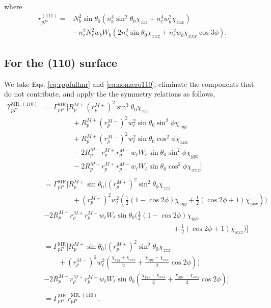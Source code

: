 where
\begin{equation}\label{eq:final-rpp.111}
\begin{split}
r^{(111)}_{pP} = 
&N^{2}_{b}\sin\theta_{0}(n^{4}_{b}\sin^{2}\theta_{0}\chi_{zzz} 
+ n^{4}_{\ell}w^{2}_{b}\chi_{zxx})\\
&- n^{2}_{\ell}N^{2}_{\ell}w_{b}W_{b}(2n^{2}_{b}\sin\theta_{0}\chi_{xxz}
 + n^{2}_{\ell}w_{b}\chi_{xxx}\cos3\phi).
\end{split}
\end{equation}


\subsection{For the (110) surface}

We take Eqs. \eqref{eq:rppfullmr} and \eqref{eq:nonzero110}, eliminate the
components that do not contribute, and apply the the symmetry relations as
follows,
\begin{equation*}
\begin{split}
\Upsilon^{\mathrm{MR},(110)}_{pP} &=
\Gamma^{\mathrm{MR}}_{pP}
\bigg[
R^{M+}_{p}\left(r^{M+}_{p}\right)^{2}\sin^{3}\theta_{0}\chi_{zzz}\\
&\qquad\qquad+ R^{M+}_{p}\left(r^{M-}_{p}\right)^{2}w^{2}_{\ell}
      \sin\theta_{0}\sin^{2}\phi\chi_{zyy}\\
&\qquad\qquad+ R^{M+}_{p}\left(r^{M-}_{p}\right)^{2}w^{2}_{\ell}
      \sin\theta_{0}\cos^{2}\phi\chi_{zxx}\\
&\qquad\qquad- 2R^{M-}_{p}r^{M+}_{p}r^{M-}_{p}w_{\ell}W_{\ell}
      \sin\theta_{0}\sin^{2}\phi\chi_{yyz}\\
&\qquad\qquad- 2R^{M-}_{p}r^{M+}_{p}r^{M-}_{p}w_{\ell}W_{\ell}
      \sin\theta_{0}\cos^{2}\phi\chi_{xxz}
\bigg]\\\\
&=
\Gamma^{\mathrm{MR}}_{pP}
\bigg[
R^{M+}_{p}\sin\theta_{0}
\bigg(
\left(r^{M+}_{p}\right)^{2}\sin^{2}\theta_{0}\chi_{zzz}\\
&\qquad\qquad+ \left(r^{M-}_{p}\right)^{2}w^{2}_{\ell}
\left(
\frac{1}{2}(1-\cos2\phi)\chi_{zyy} + \frac{1}{2}(\cos2\phi+1)\chi_{zxx}
\right)
\bigg)\\
&- 2R^{M-}_{p}r^{M+}_{p}r^{M-}_{p}w_{\ell}W_{\ell}\sin\theta_{0}
\bigg(
\frac{1}{2}(1-\cos2\phi)\chi_{yyz}\\
&\qquad\qquad\qquad\qquad\qquad\qquad\qquad\qquad\qquad
+ \frac{1}{2}(\cos2\phi+1)\chi_{xxz}
\bigg)
\bigg]\\\\
&=
\Gamma^{\mathrm{MR}}_{pP}
\bigg[
R^{M+}_{p}\sin\theta_{0}
\bigg(
\left(r^{M+}_{p}\right)^{2}\sin^{2}\theta_{0}\chi_{zzz}\\
&\qquad+ \left(r^{M-}_{p}\right)^{2}w^{2}_{\ell}
\left(
\frac{\chi_{zyy} + \chi_{zxx}}{2} + \frac{\chi_{zyy} - \chi_{zxx}}{2}\cos2\phi
\right)
\bigg)\\
&- 2R^{M-}_{p}r^{M+}_{p}r^{M-}_{p}w_{\ell}W_{\ell}\sin\theta_{0}
\left(
\frac{\chi_{yyz} + \chi_{xxz}}{2} + \frac{\chi_{yyz} - \chi_{xxz}}{2}\cos2\phi
\right)
\bigg]\\\\
&= \Gamma^{\mathrm{MR}}_{pP}\,r^{\mathrm{MR},(110)}_{pP},
\end{split}
\end{equation*}
